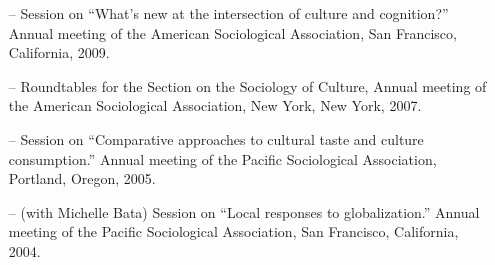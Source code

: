 \begin{itemize}[itemsep=-0.5ex]
    \item[--] Session on ``What's new at the intersection of culture and cognition?'' Annual meeting of the American Sociological Association, San Francisco, California, 2009.
    \item[--] Roundtables for the Section on the Sociology of Culture, Annual meeting of the American Sociological Association, New York, New York, 2007.
    \item[--] Session on ``Comparative approaches to cultural taste and culture consumption.'' Annual meeting of the Pacific Sociological Association, Portland, Oregon, 2005.
    \item[--] (with Michelle Bata) Session on ``Local responses to globalization.'' Annual meeting of the Pacific Sociological Association, San Francisco, California, 2004.
\end{itemize}
